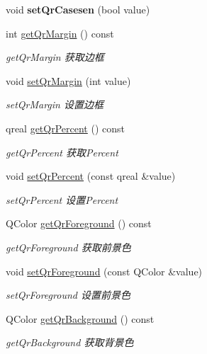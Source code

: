 \begin{DoxyCompactItemize}
void {\bfseries set\+Qr\+Casesen} (bool value)
\item 
int \mbox{\hyperlink{class_q_qt_custom_qr_encode_widget_af3e13e62da7268b70b8031a364987d0f}{get\+Qr\+Margin}} () const
\begin{DoxyCompactList}\small\item\em get\+Qr\+Margin 获取边框 \end{DoxyCompactList}\item 
void \mbox{\hyperlink{class_q_qt_custom_qr_encode_widget_a6dd530a988c36e52e9dbb81467ef026a}{set\+Qr\+Margin}} (int value)
\begin{DoxyCompactList}\small\item\em set\+Qr\+Margin 设置边框 \end{DoxyCompactList}\item 
qreal \mbox{\hyperlink{class_q_qt_custom_qr_encode_widget_a4258c5464c9dea89ed3102f3241fedc5}{get\+Qr\+Percent}} () const
\begin{DoxyCompactList}\small\item\em get\+Qr\+Percent 获取\+Percent \end{DoxyCompactList}\item 
void \mbox{\hyperlink{class_q_qt_custom_qr_encode_widget_adeba985299fc5f71c6c41ac0fa9abeb3}{set\+Qr\+Percent}} (const qreal \&value)
\begin{DoxyCompactList}\small\item\em set\+Qr\+Percent 设置\+Percent \end{DoxyCompactList}\item 
Q\+Color \mbox{\hyperlink{class_q_qt_custom_qr_encode_widget_afd01ff570a95925461638e32da50114a}{get\+Qr\+Foreground}} () const
\begin{DoxyCompactList}\small\item\em get\+Qr\+Foreground 获取前景色 \end{DoxyCompactList}\item 
void \mbox{\hyperlink{class_q_qt_custom_qr_encode_widget_a8cabaac803e1229f8672afa308922075}{set\+Qr\+Foreground}} (const Q\+Color \&value)
\begin{DoxyCompactList}\small\item\em set\+Qr\+Foreground 设置前景色 \end{DoxyCompactList}\item 
Q\+Color \mbox{\hyperlink{class_q_qt_custom_qr_encode_widget_a4149d5d7ba204a36a7e5f1db66229261}{get\+Qr\+Background}} () const
\begin{DoxyCompactList}\small\item\em get\+Qr\+Background 获取背景色 \end{DoxyCompactList}\item 

\end{DoxyCompactItemize}
